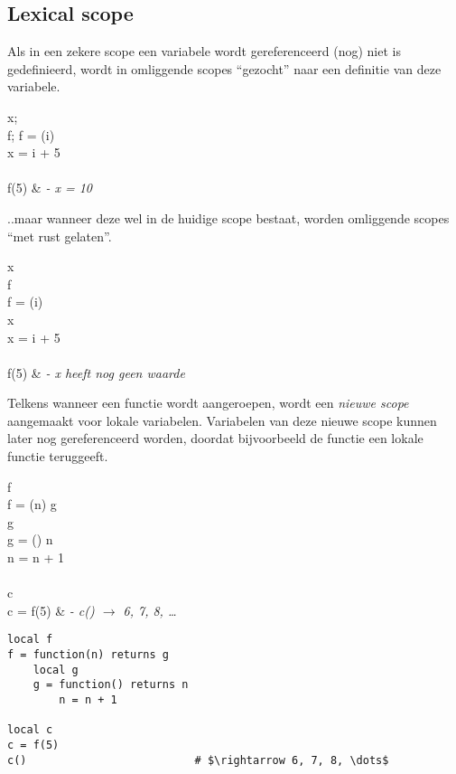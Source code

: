 \subsection{Lexical scope}

Als in een zekere scope een variabele wordt gereferenceerd (nog) niet is gedefinieerd, wordt in omliggende scopes ``gezocht'' naar een definitie van deze variabele.

\begin{SyntaxExample}\label{exa:lexical}
		\N \VAR x; \\
		\N \VAR f;\; f = \FUN(i) \\
		\N \IN x = i + 5 \\
		\N \\
		\N f(5) & \textit{- x = 10}
	\end{SyntaxExample}

..maar wanneer deze wel in de huidige scope bestaat, worden omliggende scopes ``met rust gelaten''.

	\begin{SyntaxExample}
		\N \VAR x \\
		\N \VAR f \\
		\N f = \FUN(i) \\
		\N \IN \VAR x \\
		\N \IN x = i + 5 \\
		\N \\
		\N f(5) & \textit{- x heeft nog geen waarde}
	\end{SyntaxExample}

Telkens wanneer een functie wordt aangeroepen, wordt een \emph{nieuwe scope} aangemaakt voor lokale variabelen. Variabelen van deze nieuwe scope kunnen later nog gereferenceerd worden, doordat bijvoorbeeld de functie een lokale functie teruggeeft.

	\begin{SyntaxExample}
		\N \VAR f \\
		\N f = \FUN(n) \RETURNS g \\
		\N \IN \VAR g \\
		\N \IN g = \FUN() \RETURNS n \\
		\N \IN \IN n = n + 1 \\
		\N \\
		\N \VAR c \\
		\N c = f(5) & \textit{- c() $\rightarrow$ 6, 7, 8, \dots}
	\end{SyntaxExample}

\begin{lstlisting}[caption=Een countervoorbeeld,label=exa:counter]
local f
f = function(n) returns g
    local g
    g = function() returns n
        n = n + 1

local c
c = f(5)
c()                          # $\rightarrow 6, 7, 8, \dots$
\end{lstlisting}

